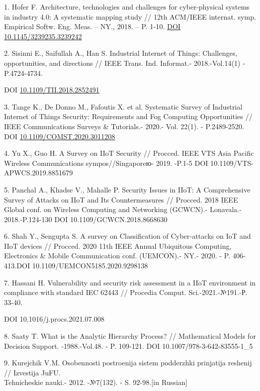 \begin{references}
1. Hofer F. Architecture, technologies and challenges for cyber-physical
systems in industry 4.0: A systematic mapping study // 12th ACM/IEEE
internat. symp. Empirical Softw. Eng. Meas. -- NY., 2018. -- P. 1-10.
\href{https://doi.org/10.1145/3239235.3239242}{DOI
10.1145/3239235.3239242}

2. Sisinni E., Saifullah A., Han S. Industrial Internet of Things:
Challenges, opportunities, and directions // IEEE Trans. Ind. Informat.-
2018.-Vol.14(1) - P.4724-4734.

DOI
\href{https://doi.org/10.1109/TII.2018.2852491}{10.1109/TII.2018.2852491}

3. Tange K., De Donno M., Fafoutis X. et al. Systematic Survey of
Industrial Internet of Things Security: Requirements and Fog Computing
Opportunities // IEEE Communications Surveys \& Tutorials.- 2020.- Vol.
22(1). - P.2489-2520. DOI
\href{http://dx.doi.org/10.1109/COMST.2020.3011208}{10.1109/COMST.2020.3011208}

4. Yu X., Guo H. A Survey on IIoT Security // Procced. IEEE VTS Asia
Pacific Wireless Communications sympos//Singaporeю- 2019. -P.1-5 DOI
10.1109/VTS-APWCS.2019.8851679

5. Panchal A., Khadse V., Mahalle P. Security Issues in IIoT: A
Comprehensive Survey of Attacks on IIoT and Its Countermeasures //
Procced. 2018 IEEE Global conf. on Wireless Computing and Networking
(GCWCN).- Lonavala.- 2018.-P.124-130 DOI 10.1109/GCWCN.2018.8668630

6. Shah Y., Sengupta S. A survey on Classification of Cyber-attacks on
IoT and IIoT devices // Procced. 2020 11th IEEE Annual Ubiquitous
Computing, Electronics \& Mobile Communication conf. (UEMCON).- NY.-
2020. - P. 406-413.DOI 10.1109/UEMCON5185.2020.9298138

7. Hassani H. Vulnerability and security risk assessment in a IIoT
environment in compliance with standard IEC 62443 // Procedia Comput.
Sci.-2021.-№191.-Р. 33-40.

DOI 10.1016/j.procs.2021.07.008

8. Saaty T. What is the Analytic Hierarchy Process? // Mathematical
Models for Decision Support. -1988.-Vol.48. - P. 109-121. DOI
10.1007/978-3-642-83555-1\_5

9. Kurejchik V.M. Osobennosti postroenija sistem podderzhki prinjatija
reshenij // Izvestija JuFU. \\Tehnicheskie nauki.- 2012. -№7(132). - S.
92-98.{[}in Russian{]}


\end{references}
